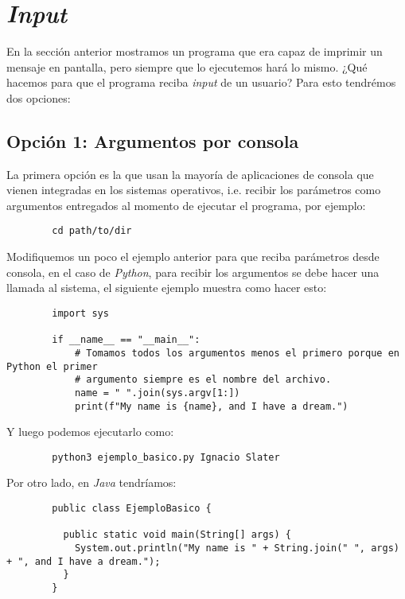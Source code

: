   \section{\textit{Input}}
    En la sección anterior mostramos un programa que era capaz de imprimir un mensaje en
    pantalla, pero siempre que lo ejecutemos hará lo mismo.
    ¿Qué hacemos para que el programa reciba \textit{input} de un usuario?
    Para esto tendrémos dos opciones:

    \subsection{Opción 1: Argumentos por consola}
      La primera opción es la que usan la mayoría de aplicaciones de consola que vienen 
      integradas en los sistemas operativos, i.e. recibir los parámetros como argumentos
      entregados al momento de ejecutar el programa, por ejemplo:

      \begin{verbatim}
        cd path/to/dir
      \end{verbatim}

      Modifiquemos un poco el ejemplo anterior para que reciba parámetros desde consola,
      en el caso de \textit{Python}, para recibir los argumentos se debe hacer una llamada
      al sistema, el siguiente ejemplo muestra como hacer esto:

      \begin{verbatim}
        import sys

        if __name__ == "__main__":
            # Tomamos todos los argumentos menos el primero porque en Python el primer 
            # argumento siempre es el nombre del archivo.
            name = " ".join(sys.argv[1:])
            print(f"My name is {name}, and I have a dream.")
      \end{verbatim}

      Y luego podemos ejecutarlo como:

      \begin{verbatim}
        python3 ejemplo_basico.py Ignacio Slater
      \end{verbatim}

      Por otro lado, en \textit{Java} tendríamos:

      \begin{verbatim}
        public class EjemploBasico {

          public static void main(String[] args) {
            System.out.println("My name is " + String.join(" ", args) + ", and I have a dream.");
          }
        }
      \end{verbatim}

